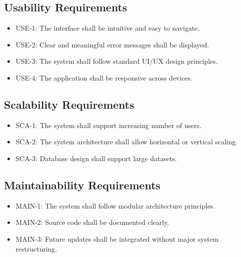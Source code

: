 \subsection{Usability Requirements}

\begin{itemize}
\item USE-1: The interface shall be intuitive and easy to navigate.
\item USE-2: Clear and meaningful error messages shall be displayed.
\item USE-3: The system shall follow standard UI/UX design principles.
\item USE-4: The application shall be responsive across devices.
\end{itemize}


\subsection{Scalability Requirements}

\begin{itemize}
\item SCA-1: The system shall support increasing number of users.
\item SCA-2: The system architecture shall allow horizontal or vertical scaling.
\item SCA-3: Database design shall support large datasets.
\end{itemize}


\subsection{Maintainability Requirements}

\begin{itemize}
\item MAIN-1: The system shall follow modular architecture principles.
\item MAIN-2: Source code shall be documented clearly.
\item MAIN-3: Future updates shall be integrated without major system restructuring.
\end{itemize}



